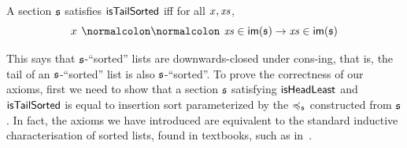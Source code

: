 \begin{definition}
    \label{def:tail-sort}
    A section $\mathfrak{s}$ satisfies $\operatorname{\mathsf{isTailSorted}}$ iff
    for all $x, \mathit{xs}$,
    \[
        \inimage{x \cons \xs} \to \inimage{\xs}
    \]
\end{definition}
%
This says that $\mathfrak{s}$-``sorted'' lists are downwards-closed under cons-ing, that is,
the tail of an $\mathfrak{s}$-``sorted'' list is also $\mathfrak{s}$-``sorted''.
%
To prove the correctness of our axioms,
first we need to show that a section $\mathfrak{s}$ satisfying
$\operatorname{\mathsf{isHeadLeast}}$ and $\operatorname{\mathsf{isTailSorted}}$ is equal to insertion sort parameterized by
the $\preccurlyeq_{\mathfrak{s}}$ constructed from $\mathfrak{s}$.
%
In fact, the axioms we have introduced are equivalent to the standard inductive characterisation of sorted lists,
found in textbooks, such as in~\cite{appelVerifiedFunctionalAlgorithms2023}.

